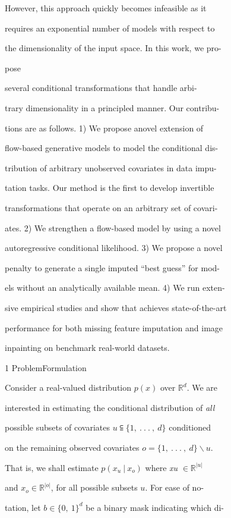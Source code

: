 \documentclass[a4paper,12pt]{article}
\begin{document}
However, this approach quickly becomes infeasible as it

requires an exponential number of models with respect to

the dimensionality of the input space. In this work, we pro-

pose

several conditional transformations that handle arbi-

trary dimensionality in a principled manner. Our contribu-

tions are as follows. 1) We propose anovel extension of

flow-based generative models to model the conditional dis-

tribution of arbitrary unobserved covariates in data impu-

tation tasks. Our method is the first to develop invertible

transformations that operate on an arbitrary set of covari-

ates. 2) We strengthen a flow-based model by using a novel

autoregressive conditional likelihood. 3) We propose a novel

penalty to generate a single imputed “best guess” for mod-

els without an analytically available mean. 4) We run exten-

sive empirical studies and show that achieves state-of-the-art

performance for both missing feature imputation and image

inpainting on benchmark real-world datasets.

1 ProblemFormulation

Consider a real-valued distribution $p(x)$ over $\mathbb{R}^{d}$. We are

interested in estimating the conditional distribution of {\it all}

possible subsets of covariates $u \subseteqq \{1,\ .\ .\ .\ ,\ d\}$ conditioned

on the remaining observed covariates $o = \{1,\ .\ .\ .\ ,\ d\}\backslash u.$

That is, we shall estimate $p (x_{u}\ |\ x_{o})$ where {\it xu} $\in \mathbb{R}^{|u|}$

and $x_{o} \in \mathbb{R}^{|o|}$, for all possible subsets $u$. For ease of no-

tation, let $b\in\{0,\ 1\}^{d}$ be a binary mask indicating which di-
\end{document}
